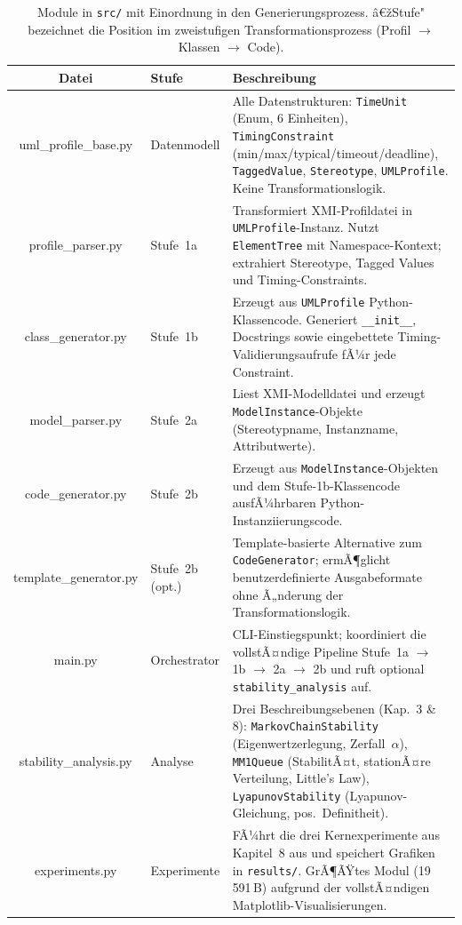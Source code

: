 ﻿\documentclass[a4paper,12pt]{report}
\theoremstyle{definition}
\begin{document}
\begin{table}[H]
	\small
	\centering
	\renewcommand{\arraystretch}{1.35}
	\begin{tabular}{@{} C l p{6.1cm} @{}}
		\toprule
		\normalfont\textbf{Datei} &
		\textbf{Stufe} &
		\textbf{Beschreibung} \\
		\midrule
		uml\_profile\_base.py  & Datenmodell &
		Alle Datenstrukturen: \texttt{TimeUnit} (Enum, 6 Einheiten),
		\texttt{TimingConstraint} (min/max/typical/timeout/deadline),
		\texttt{TaggedValue}, \texttt{Stereotype}, \texttt{UMLProfile}.
		Keine Transformationslogik. \\
		
		profile\_parser.py     & Stufe~1a &
		Transformiert XMI-Profildatei in \texttt{UMLProfile}-Instanz.
		Nutzt \texttt{ElementTree} mit Namespace-Kontext; extrahiert
		Stereotype, Tagged Values und Timing-Constraints. \\
		
		class\_generator.py    & Stufe~1b &
		Erzeugt aus \texttt{UMLProfile} Python-Klassencode.
		Generiert \texttt{\_\_init\_\_}, Docstrings sowie eingebettete
		Timing-Validierungsaufrufe fÃ¼r jede Constraint. \\
		
		model\_parser.py       & Stufe~2a &
		Liest XMI-Modelldatei und erzeugt \texttt{ModelInstance}-Objekte
		(Stereotypname, Instanzname, Attributwerte). \\
		
		code\_generator.py     & Stufe~2b &
		Erzeugt aus \texttt{ModelInstance}-Objekten und dem
		Stufe-1b-Klassencode ausfÃ¼hrbaren Python-Instanziierungscode. \\
		
		template\_generator.py & Stufe~2b (opt.) &
		Template-basierte Alternative zum \texttt{CodeGenerator};
		ermÃ¶glicht benutzerdefinierte Ausgabeformate ohne Ã„nderung
		der Transformationslogik. \\
		
		main.py                & Orchestrator &
		CLI-Einstiegspunkt; koordiniert die vollstÃ¤ndige Pipeline
		Stufe~1a $\to$ 1b $\to$ 2a $\to$ 2b und ruft optional
		\texttt{stability\_analysis} auf. \\
		
		stability\_analysis.py & Analyse &
		Drei Beschreibungsebenen (Kap.~3 \& 8):
		\texttt{MarkovChainStability} (Eigenwertzerlegung, Zerfall~$\alpha$),
		\texttt{MM1Queue} (StabilitÃ¤t, stationÃ¤re Verteilung, Little's Law),
		\texttt{LyapunovStability} (Lyapunov-Gleichung, pos.\ Definitheit). \\
		
		experiments.py         & Experimente &
		FÃ¼hrt die drei Kernexperimente aus Kapitel~8 aus und speichert
		Grafiken in \texttt{results/}. GrÃ¶ÃŸtes Modul (19\,591\,B)
		aufgrund der vollstÃ¤ndigen Matplotlib-Visualisierungen. \\
		\bottomrule
	\end{tabular}
	\caption{Module in \texttt{src/} mit Einordnung in den
		Generierungsprozess.  â€žStufe" bezeichnet die Position
		im zweistufigen Transformationsprozess
		(Profil $\to$ Klassen $\to$ Code).}
	\label{tab:module-src}
\end{table}
\end{document}
